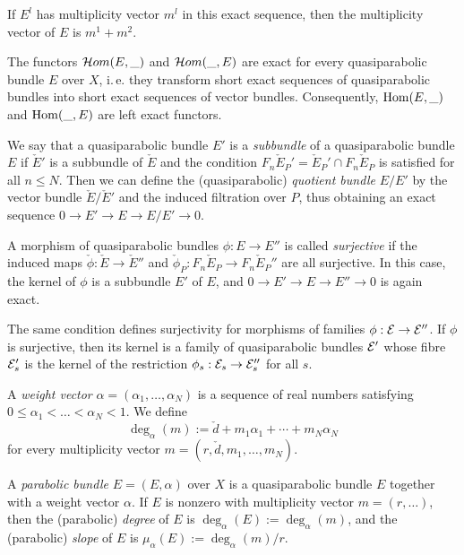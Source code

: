 \documentclass{article}
\begin{document}
If $E^l$ has multiplicity vector $m^l$ in this exact sequence, then the multiplicity vector of $E$ is $m^1 + m^2$.

The functors $\mathcal{H}om( E, \_)$ and $\mathcal{H}om( \_, E)$ are exact for every quasiparabolic bundle $E$ over $X$, i.\,e. they transform short exact
sequences of quasiparabolic bundles into short exact sequences of vector bundles. Consequently, $\mathrm{Hom}( E, \_)$ and $\mathrm{Hom}( \_, E)$ are left exact functors.

We say that a quasiparabolic bundle $E'$ is a \emph{subbundle} of a quasiparabolic bundle $E$ if $\check{E}'$ is a subbundle of $\check{E}$ and the
condition $F_n \check{E}_P' = \check{E}_P' \cap F_n \check{E}_P$ is satisfied for all $n \leq N$. Then we can define the (quasiparabolic)
\emph{quotient bundle} $E/E'$ by the vector bundle $\check{E}/\check{E}'$ and the induced filtration over $P$, thus obtaining an exact sequence
$0 \to E' \to E \to E/E' \to 0$.

A morphism of quasiparabolic bundles $\phi: E \to E''$ is called \emph{surjective} if the induced maps $\check{\phi}: \check{E} \to \check{E}''$ and
$\check{\phi}_P: F_n \check{E}_P \to F_n \check{E}_P''$ are all surjective. In this case, the kernel of $\phi$ is a subbundle $E'$ of $E$, and
$0 \to E' \to E \to E'' \to 0$ is again exact.

The same condition defines surjectivity for morphisms of families $\phi: \mathcal{E} \to \mathcal{E}''$. If $\phi$ is surjective, then its kernel is a family of
quasiparabolic bundles $\mathcal{E}'$ whose fibre $\mathcal{E}_s'$ is the kernel of the restriction $\phi_s: \mathcal{E}_s \to \mathcal{E}_s''$ for all $s$.

\begin{defn}
  A \emph{weight vector} $\alpha = (\alpha_1, \ldots, \alpha_N)$ is a sequence of real numbers satisfying $0 \leq \alpha_1 < \ldots < \alpha_N < 1$.
  We define
  \begin{displaymath}
    \deg_{\alpha}(m) := \check{d} + m_1 \alpha_1 + \cdots + m_N \alpha_N
  \end{displaymath}
  for every multiplicity vector $m = (r, \check{d}, m_1, \ldots, m_N)$.
\end{defn}

\begin{defn}
  A \emph{parabolic bundle} $E = (E, \alpha)$ over $X$ is a quasiparabolic bundle $E$ together with a weight vector $\alpha$. If $E$ is nonzero with
  multiplicity vector $m = (r, \ldots)$, then the (parabolic) \emph{degree} of $E$ is $\deg_{\alpha}(E):= \deg_{\alpha}(m)$, and the (parabolic)
  \emph{slope} of $E$ is $\mu_{\alpha}(E):= \deg_{\alpha}(m)/r$.
\end{defn}
\end{document}
